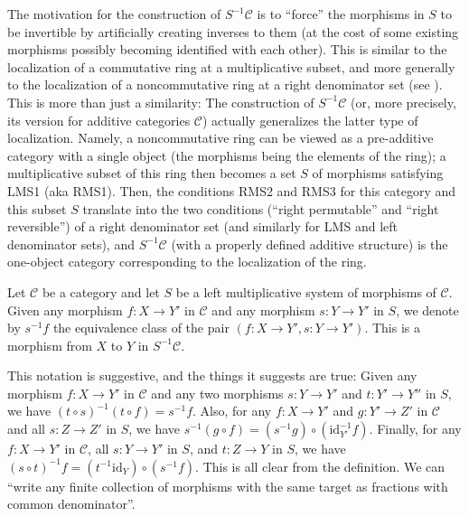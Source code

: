 \begin{remark}
\label{remark-motivation-localization}
The motivation for the construction of $S^{-1} \mathcal{C}$ is to
``force'' the morphisms in $S$ to be invertible by artificially
creating inverses to them (at the cost of some existing morphisms
possibly becoming identified with each other). This is similar to
the localization of a commutative ring at a multiplicative subset,
and more generally to the localization of a noncommutative ring
at a right denominator set (see \cite[Section 10A]{Lam}). This is
more than just a similarity: The construction of
$S^{-1} \mathcal{C}$ (or, more precisely, its version for
additive categories $\mathcal{C}$) actually generalizes the
latter type of localization. Namely, a noncommutative ring can be
viewed as a pre-additive category with a single object (the morphisms
being the elements of the ring); a multiplicative subset of this
ring then becomes a set $S$ of morphisms satisfying LMS1 (aka
RMS1). Then, the conditions RMS2 and RMS3 for this category and
this subset $S$ translate into the two conditions
(``right permutable'' and ``right reversible'') of a right
denominator set (and similarly for LMS and left denominator sets),
and $S^{-1} \mathcal{C}$ (with a properly defined additive
structure) is the one-object category corresponding to the
localization of the ring.
\end{remark}

\begin{definition}
\label{definition-left-localization-as-fraction}
Let $\mathcal{C}$ be a category and let $S$ be a left multiplicative
system of morphisms of $\mathcal{C}$. Given any morphism
$f : X \to Y'$ in $\mathcal{C}$ and any morphism $s : Y \to Y'$ in
$S$, we denote by {\it $s^{-1} f$} the equivalence class of the pair
$(f : X \to Y', s : Y \to Y')$. This is a morphism from $X$ to $Y$
in $S^{-1} \mathcal{C}$.
\end{definition}

\noindent
This notation is suggestive, and the things it suggests are true:
Given any morphism $f : X \to Y'$ in $\mathcal{C}$ and any two
morphisms $s : Y \to Y'$ and $t : Y' \to Y''$ in $S$, we have
$\left(t \circ s\right)^{-1} \left(t \circ f\right) = s^{-1} f$.
Also, for any
$f : X \to Y'$ and $g : Y' \to Z'$ in $\mathcal{C}$ and all
$s : Z \to Z'$ in $S$, we have
$s^{-1} \left(g \circ f\right) = \left(s^{-1} g\right) \circ
\left(\text{id}_{Y'}^{-1} f\right)$.
Finally, for any $f : X \to Y'$ in $\mathcal{C}$, all
$s : Y \to Y'$ in $S$, and $t : Z \to Y$ in $S$, we have
$\left(s \circ t\right)^{-1} f
= \left(t^{-1} \text{id}_Y\right)
\circ \left(s^{-1} f\right)$.
This is all clear from the definition.
We can ``write any finite collection of morphisms with the same target
as fractions with common denominator''.

